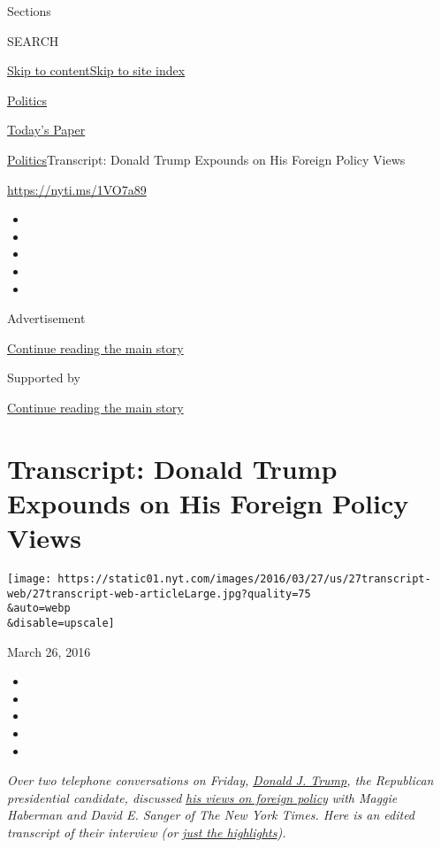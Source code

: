 Sections

SEARCH

\protect\hyperlink{site-content}{Skip to
content}\protect\hyperlink{site-index}{Skip to site index}

\href{https://www.nytimes.com/section/politics}{Politics}

\href{https://myaccount.nytimes.com/auth/login?response_type=cookie\&client_id=vi}{}

\href{https://www.nytimes.com/section/todayspaper}{Today's Paper}

\href{/section/politics}{Politics}\textbar{}Transcript: Donald Trump
Expounds on His Foreign Policy Views

\url{https://nyti.ms/1VO7a89}

\begin{itemize}
\item
\item
\item
\item
\item
\end{itemize}

Advertisement

\protect\hyperlink{after-top}{Continue reading the main story}

Supported by

\protect\hyperlink{after-sponsor}{Continue reading the main story}

\hypertarget{transcript-donald-trump-expounds-on-his-foreign-policy-views}{%
\section{Transcript: Donald Trump Expounds on His Foreign Policy
Views}\label{transcript-donald-trump-expounds-on-his-foreign-policy-views}}

\texttt{[image: https://static01.nyt.com/images/2016/03/27/us/27transcript-web/27transcript-web-articleLarge.jpg?quality=75\\\&auto=webp\\\&disable=upscale]}

March 26, 2016

\begin{itemize}
\item
\item
\item
\item
\item
\end{itemize}

\emph{Over two telephone conversations on Friday,}
\href{http://www.nytimes.com/2016/03/27/us/politics/donald-trump-foreign-policy.html}{\emph{Donald
J. Trump}}\emph{, the Republican presidential candidate, discussed}
\href{http://www.nytimes.com/2016/03/27/us/politics/donald-trump-foreign-policy.html}{\emph{his
views on foreign policy}} \emph{with Maggie Haberman and David E. Sanger
of The New York Times. Here is an edited transcript of their interview
(or}
\href{http://www.nytimes.com/2016/03/27/us/politics/donald-trump-interview-highlights.html}{\emph{just
the highlights}}\emph{).}

